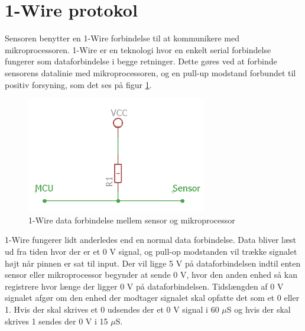 \newpage
\section{1-Wire protokol}
Sensoren benytter en 1-Wire forbindelse til at kommunikere med mikroprocessoren. 1-Wire er en teknologi hvor en  enkelt serial forbindelse fungerer som dataforbindelse i begge retninger. Dette gøres ved at forbinde sensorens datalinie med mikroprocessoren, og en pull-up modstand forbundet til positiv forsyning, som det ses på figur \ref{one_wire_schematic}. 

\begin{figure}[h!]
  \centering
  \includegraphics[width=0.7\textwidth]{figures/onewire_eksempel.png}
  \caption{1-Wire data forbindelse mellem sensor og mikroprocessor}
  \label{one_wire_schematic}
\end{figure}

1-Wire fungerer lidt anderledes end en normal data forbindelse. Data bliver læst ud fra tiden hvor der er et 0 V signal, og pull-op modstanden vil trække signalet højt når pinnen er sat til input. Der vil ligge 5 V på dataforbindelsen indtil enten sensor eller mikroprocessor begynder at sende 0 V, hvor den anden enhed så kan registrere hvor længe der ligger 0 V på dataforbindelsen. Tidslængden af 0 V signalet afgør om den enhed der modtager signalet skal opfatte det som et 0 eller 1. Hvis der skal skrives et 0 udsendes der et 0 V signal i 60 $\mu$S og hvis der skal skrives 1 sendes der 0 V i 15 $\mu$S. 

